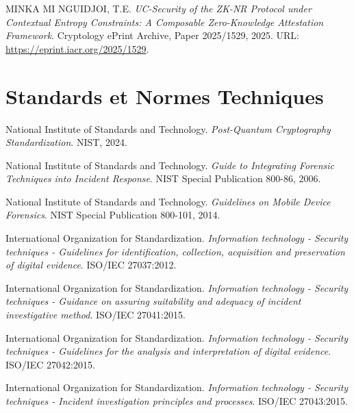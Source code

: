\documentclass[11pt,a4paper,oneside]{book}
\begin{document}
\begin{thebibliography}{99}
        MINKA MI NGUIDJOI, T.E.
        \emph{UC-Security of the ZK-NR Protocol under Contextual Entropy Constraints: A Composable Zero-Knowledge Attestation Framework}.
        Cryptology ePrint Archive, Paper 2025/1529, 2025.
        URL: \url{https://eprint.iacr.org/2025/1529}.


      \section*{Standards et Normes Techniques}


        National Institute of Standards and Technology.
        \emph{Post-Quantum Cryptography Standardization}.
        NIST, 2024.

        National Institute of Standards and Technology.
        \emph{Guide to Integrating Forensic Techniques into Incident Response}.
        NIST Special Publication 800-86, 2006.

        National Institute of Standards and Technology.
        \emph{Guidelines on Mobile Device Forensics}.
        NIST Special Publication 800-101, 2014.

        International Organization for Standardization.
        \emph{Information technology - Security techniques - Guidelines for identification, collection, acquisition and preservation of digital evidence}.
        ISO/IEC 27037:2012.

        International Organization for Standardization.
        \emph{Information technology - Security techniques - Guidance on assuring suitability and adequacy of incident investigative method}.
        ISO/IEC 27041:2015.

        International Organization for Standardization.
        \emph{Information technology - Security techniques - Guidelines for the analysis and interpretation of digital evidence}.
        ISO/IEC 27042:2015.

        International Organization for Standardization.
        \emph{Information technology - Security techniques - Incident investigation principles and processes}.
        ISO/IEC 27043:2015.


\end{thebibliography}
\end{document}
